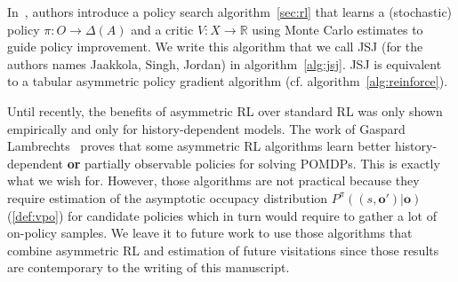 In~\cite{jsj}, authors introduce a policy search algorithm~\ref{sec:rl} that learns a (stochastic) policy $\pi:O\rightarrow\Delta(A)$ and a critic $V:X\rightarrow \mathbb{R}$ using Monte Carlo estimates to guide policy improvement.
We write this algorithm that we call JSJ (for the authors names Jaakkola, Singh, Jordan) in algorithm~\ref{alg:jsj}. JSJ is equivalent to a tabular asymmetric policy gradient algorithm (cf. algorithm~\ref{alg:reinforce}). 

Until recently, the benefits of asymmetric RL over standard RL was only shown empirically and only for history-dependent models.
The work of Gaspard Lambrechts~\cite{justif-asym} proves that some asymmetric RL algorithms learn better history-dependent \textbf{or} partially observable policies for solving POMDPs.
This is exactly what we wish for. However, those algorithms are not practical because they require estimation of the asymptotic occupacy distribution $P^{\pi}((s, \boldsymbol{o}')|\boldsymbol{o})$ (\ref{def:vpo}) for candidate policies which in turn would require to gather a lot of on-policy samples.
We leave it to future work to use those algorithms that combine asymmetric RL and estimation of future visitations since those results are contemporary to the writing of this manuscript.

